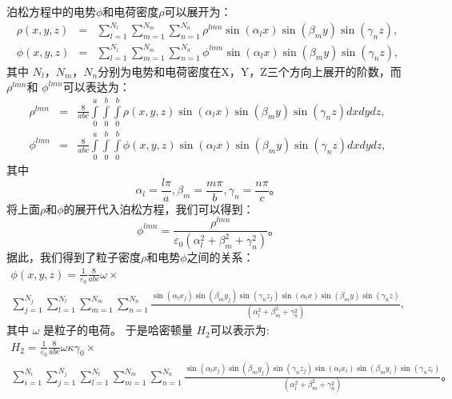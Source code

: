 {泊松方程中的电势$\phi$和电荷密度$\rho$可以展开为：
\begin{eqnarray}
 \rho(x,y,z)&=&\sum\limits_{l=1}^{{{N}_{l}}}{\sum\limits_{m=1}^{{{N}_{m}}}{\sum\limits_{n=1}^{{{N}_{n}}}{{{\rho }^{lmn}}\sin ({{\alpha }_{l}}x)\sin ({{\beta }_{m}}y)\sin ({{\gamma }_{n}}z)}}}, \\
 \phi(x,y,z)&=&\sum\limits_{l=1}^{{{N}_{l}}}{\sum\limits_{m=1}^{{{N}_{m}}}{\sum\limits_{n=1}^{{{N}_{n}}}{{{\phi }^{lmn}}\sin ({{\alpha }_{l}}x)\sin ({{\beta }_{m}}y)\sin ({{\gamma }_{n}}z)}}},
\end{eqnarray}
其中 ${N}_{l}$，${N}_{m}$，${N}_{n}$分别为电势和电荷密度在X，Y，Z三个方向上展开的阶数，而 ${\rho }^{lmn}$和 ${\phi }^{lmn}$可以表达为：
\begin{eqnarray}
  {{\rho }^{lmn}}&=&\frac{8}{abc}\int\limits_{0}^{a}{\int\limits_{0}^{b}{\int\limits_{0}^{b}{\rho (x,y,z)\sin ({{\alpha }_{l}}x)\sin ({{\beta }_{m}}y)\sin ({{\gamma }_{n}}z)dxdydz}}}, \\
 {{\phi }^{lmn}}&=&\frac{8}{abc}\int\limits_{0}^{a}{\int\limits_{0}^{b}{\int\limits_{0}^{b}{\phi (x,y,z)\sin ({{\alpha }_{l}}x)\sin ({{\beta }_{m}}y)\sin ({{\gamma }_{n}}z)dxdydz}}},
\end{eqnarray}
其中
\begin{equation}
{{\alpha }_{l}}=\frac{l\pi }{a},{{\beta }_{m}}=\frac{m\pi }{b},{{\gamma }_{n}}=\frac{n\pi }{c}\text{。}
\end{equation}
将上面$\rho$和$\phi$的展开代入泊松方程，我们可以得到：
\begin{equation}
{{\phi }^{lmn}}=\frac{{{\rho }^{lmn}}}{{{\varepsilon }_{0}}(\alpha _{l}^{2}+\beta _{m}^{2}+\gamma _{n}^{2})}\text{。}
\end{equation}
据此，我们得到了粒子密度$ \rho $和电势$ \phi $之间的关系：
\begin{multline}
\phi (x,y,z)=\frac{1}{{{\varepsilon }_{0}}}\frac{8}{abc}\omega \times \\ \sum\limits_{j=1}^{{{N}_{j}}}{\sum\limits_{l=1}^{{{N}_{l}}}{\sum\limits_{m=1}^{{{N}_{m}}}{\sum\limits_{n=1}^{{{N}_{n}}}{\frac{\sin ({{\alpha }_{l}}{{x}_{j}})\sin ({{\beta }_{m}}{{y}_{j}})\sin ({{\gamma }_{n}}{{z}_{j}})\sin ({{\alpha }_{l}}x)\sin ({{\beta }_{m}}y)\sin ({{\gamma }_{n}}z)}{(\alpha _{l}^{2}+\beta _{m}^{2}+\gamma _{n}^{2})}}}}},
\end{multline}
其中 $\omega $ 是粒子的电荷。
于是哈密顿量 ${{H}_{2}}$可以表示为:
\begin{multline}
{{H}_{2}}=\frac{1}{{{\varepsilon }_{0}}}\frac{8}{abc}\omega \kappa {{\gamma}_{0}} \times \\
\sum\limits_{i=1}^{{{N}_{i}}}{\sum\limits_{j=1}^{{{N}_{j}}}{\sum\limits_{l=1}^{{{N}_{l}}}{\sum\limits_{m=1}^{{{N}_{m}}}{\sum\limits_{n=1}^{{{N}_{n}}}
{\frac{\sin ({{\alpha }_{l}}{{x}_{j}})\sin ({{\beta }_{m}}{{y}_{j}})\sin ({{\gamma }_{n}}{{z}_{j}})\sin ({{\alpha }_{l}}{{x}_{i}})\sin ({{\beta }_{m}}{{y}_{i}})\sin ({{\gamma }_{n}}{{z}_{i}})}{(\alpha _{l}^{2}+\beta _{m}^{2}+\gamma _{n}^{2})}}
}}}}\text{。}
\end{multline}

}
